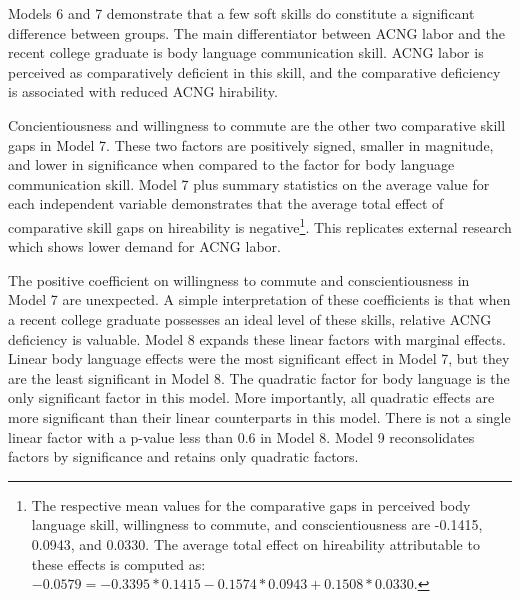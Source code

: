 \documentclass[review]{elsarticle}
\begin{document}
Models 6 and 7 demonstrate that a few soft skills do constitute a significant difference between groups.
The main differentiator between ACNG labor and the recent college graduate is body language communication skill.
ACNG labor is perceived as comparatively deficient in this skill,
and the comparative deficiency is associated with reduced ACNG hirability.

Concientiousness and willingness to commute are the other two comparative skill gaps in Model 7.
These two factors are positively signed, smaller in magnitude, and lower in significance when compared to the factor for body language communication skill.
Model 7 plus summary statistics on the average value for each independent variable demonstrates that
the average total effect of comparative skill gaps on hireability is negative\footnote{
    The respective mean values for the comparative gaps in perceived body language skill,
    willingness to commute,
    and conscientiousness
    are -0.1415, 0.0943, and 0.0330.
    The average total effect on hireability attributable to these effects is computed as:
    $-0.0579 = -0.3395*0.1415 - 0.1574*0.0943 + 0.1508*0.0330$.
}.
This replicates external research which shows lower demand for ACNG labor.

The positive coefficient on willingness to commute and conscientiousness in Model 7 are unexpected.
A simple interpretation of these coefficients is that when a recent college graduate possesses an ideal level of these skills, relative ACNG deficiency is valuable.
Model 8 expands these linear factors with marginal effects.
Linear body language effects were the most significant effect in Model 7, but they are the least significant in Model 8.
The quadratic factor for body language is the only significant factor in this model.
More importantly, all quadratic effects are more significant than their linear counterparts in this model.
There is not a single linear factor with a p-value less than 0.6 in Model 8.
Model 9 reconsolidates factors by significance and retains only quadratic factors.
\end{document}
